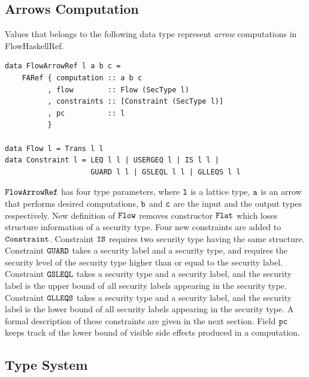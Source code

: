 \documentclass[a4paper]{report}
\newcommand{\co}[1]{$\cod{#1}$}
\begin{document}
\subsection{Arrows Computation}
\label{chap4:flowarrowref:concept}
Values that belongs to the following data type represent {\em arrow} computations
in FlowHaskellRef.
\begin{Verbatim}[fontsize=\footnotesize]
data FlowArrowRef l a b c = 
    FARef { computation :: a b c
          , flow        :: Flow (SecType l)
          , constraints :: [Constraint (SecType l)]
          , pc          :: l
          }

data Flow l = Trans l l 
data Constraint l = LEQ l l | USERGEQ l | IS l l | 
                    GUARD l l | GSLEQL l l | GLLEQS l l
\end{Verbatim}
\co{FlowArrowRef} has four type parameters, where \co{l} is a lattice type,
\co{a} is an arrow that performs desired computations, \co{b} and \co{c} are the
input and the output types respectively.
New definition of \co{Flow} removes constructor \co{Flat} which loses structure information of a
security type. Four new constraints are added to \co{Constraint}.
Constraint \co{IS} requires two security type having the same structure.
Constraint \co{GUARD} takes a security label and a security type, and requires the security 
level of the security type higher than or equal to the security label.
Constraint \co{GSLEQL} takes a security type and a security label, and the security label is the
upper bound of all security labels appearing in the security type.
Constraint \co{GLLEQS} takes a security type and a security label, and the security label is the
lower bound of all security labels appearing in the security type.
A formal description of these constraints are given in the next section.
Field \co{pc} keeps track of the lower bound of visible side effects produced in a computation.

\subsection{Type System}
\label{chap4:flowarrowref:typesystem}
\end{document}
